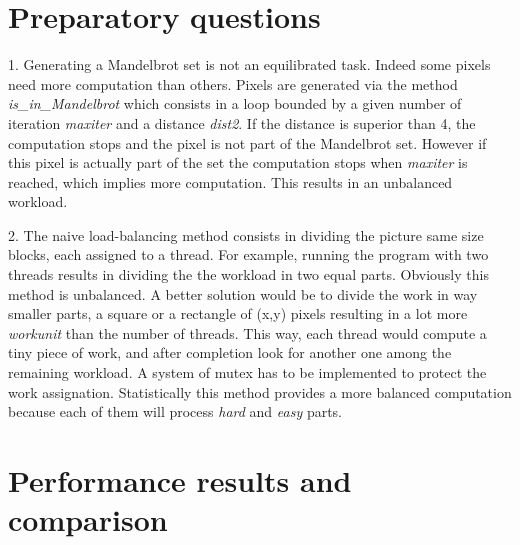 \section*{Preparatory questions}
\thispagestyle{empty}

1. Generating a Mandelbrot set is not an equilibrated task. Indeed some
pixels need more computation than others. Pixels are generated via the method 
\textit{is\_in\_Mandelbrot} 
which consists in a loop bounded by a given number of iteration
\textit{maxiter} and a distance \textit{dist2}. If the distance is superior
than 4, the computation stops and the pixel is not part of the Mandelbrot
set. However if this pixel is actually part of the set the computation stops
when \textit{maxiter} is reached, which implies more computation. 
This results in an unbalanced workload. 

2. The naive load-balancing method consists in dividing the picture same size 
blocks, each assigned to a thread. For example, running the program with two
threads results in dividing the the workload in two equal parts. Obviously
this method is unbalanced.
A better solution would be to divide the work in way smaller parts, a 
square or a rectangle of (x,y) pixels resulting in a lot more \textit{workunit}
than the number of threads.
This way, each thread would compute a tiny piece of work, and after completion
look for another one among the remaining workload. A system of mutex has to
be implemented to protect the work assignation.
Statistically this method provides a more balanced computation because each of
them will process \textit{hard} and \textit{easy} parts.

\newpage
\thispagestyle{empty}

\section*{Performance results and comparison}
